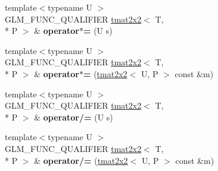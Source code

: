 \begin{DoxyCompactItemize}
\item 
\hypertarget{structglm_1_1detail_1_1tmat2x2_a4a5205fca7f31a7a453210d511cf2896}{{\footnotesize template$<$typename U $>$ }\\G\-L\-M\-\_\-\-F\-U\-N\-C\-\_\-\-Q\-U\-A\-L\-I\-F\-I\-E\-R \hyperlink{structglm_1_1detail_1_1tmat2x2}{tmat2x2}$<$ T, \\*
P $>$ \& {\bfseries operator$\ast$=} (U s)}\label{structglm_1_1detail_1_1tmat2x2_a4a5205fca7f31a7a453210d511cf2896}

\item 
\hypertarget{structglm_1_1detail_1_1tmat2x2_a8487379d072e00b6de5a77b7e655867b}{{\footnotesize template$<$typename U $>$ }\\G\-L\-M\-\_\-\-F\-U\-N\-C\-\_\-\-Q\-U\-A\-L\-I\-F\-I\-E\-R \hyperlink{structglm_1_1detail_1_1tmat2x2}{tmat2x2}$<$ T, \\*
P $>$ \& {\bfseries operator$\ast$=} (\hyperlink{structglm_1_1detail_1_1tmat2x2}{tmat2x2}$<$ U, P $>$ const \&m)}\label{structglm_1_1detail_1_1tmat2x2_a8487379d072e00b6de5a77b7e655867b}

\item 
\hypertarget{structglm_1_1detail_1_1tmat2x2_a76aee63b12a716f287b47869fe0278e4}{{\footnotesize template$<$typename U $>$ }\\G\-L\-M\-\_\-\-F\-U\-N\-C\-\_\-\-Q\-U\-A\-L\-I\-F\-I\-E\-R \hyperlink{structglm_1_1detail_1_1tmat2x2}{tmat2x2}$<$ T, \\*
P $>$ \& {\bfseries operator/=} (U s)}\label{structglm_1_1detail_1_1tmat2x2_a76aee63b12a716f287b47869fe0278e4}

\item 
\hypertarget{structglm_1_1detail_1_1tmat2x2_a59558381fd4daac499407f3d83e71da0}{{\footnotesize template$<$typename U $>$ }\\G\-L\-M\-\_\-\-F\-U\-N\-C\-\_\-\-Q\-U\-A\-L\-I\-F\-I\-E\-R \hyperlink{structglm_1_1detail_1_1tmat2x2}{tmat2x2}$<$ T, \\*
P $>$ \& {\bfseries operator/=} (\hyperlink{structglm_1_1detail_1_1tmat2x2}{tmat2x2}$<$ U, P $>$ const \&m)}\label{structglm_1_1detail_1_1tmat2x2_a59558381fd4daac499407f3d83e71da0}

\end{DoxyCompactItemize}
